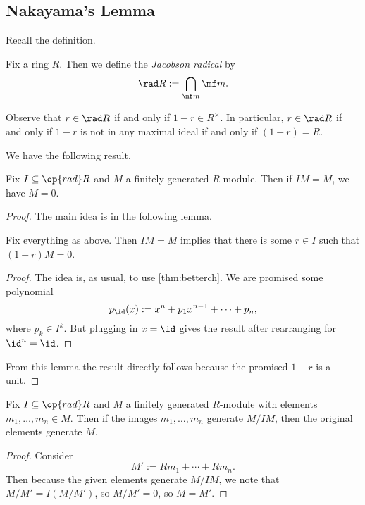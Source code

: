 \subsection{Nakayama's Lemma}
Recall the definition.
\begin{definition}
	Fix a ring $R$. Then we define the \textit{Jacobson radical} by
	\[\rad R:=\bigcap_{\mf m}\mf m.\]
\end{definition}
Observe that $r\in\rad R$ if and only if $1-r\in R^\times$. In particular, $r\in\rad R$ if and only if $1-r$ is not in any maximal ideal if and only if $(1-r)=R$.

We have the following result.
\begin{theorem}
	Fix $I\subseteq\op{rad}R$ and $M$ a finitely generated $R$-module. Then if $IM=M$, we have $M=0$.
\end{theorem}
\begin{proof}
	The main idea is in the following lemma.
	\begin{lemma}
		Fix everything as above. Then $IM=M$ implies that there is some $r\in I$ such that $(1-r)M=0$.
	\end{lemma}
	\begin{proof}
		The idea is, as usual, to use \autoref{thm:betterch}. We are promised some polynomial
		\[p_{\id}(x):=x^n+p_1x^{n-1}+\cdots+p_n,\]
		where $p_k\in I^k$. But plugging in $x=\id$ gives the result after rearranging for $\id^n=\id$.
	\end{proof}
	From this lemma the result directly follows because the promised $1-r$ is a unit.
\end{proof}
\begin{corollary}
	Fix $I\subseteq\op{rad}R$ and $M$ a finitely generated $R$-module with elements $m_1,\ldots,m_n\in M$. Then if the images $\overline{m_1},\ldots,\overline{m_n}$ generate $M/IM$, then the original elements generate $M$.
\end{corollary}
\begin{proof}
	Consider
	\[M':=Rm_1+\cdots+Rm_n.\]
	Then because the given elements generate $M/IM$, we note that $M/M'=I(M/M')$, so $M/M'=0$, so $M=M'$. 
\end{proof}

